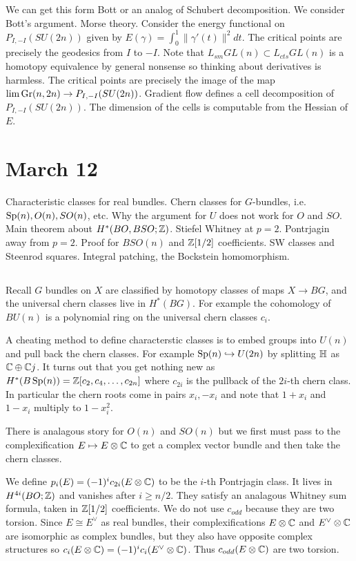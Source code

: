 \documentclass[12pt]{article}
\begin{document}
    We can get this form Bott or an analog of Schubert decomposition. We consider Bott's argument. Morse theory. Consider the energy functional on $P_{I,-I}(SU(2n))$ given by $E(\gamma) = \int_0^1 \|\gamma'(t)\|^2 dt$. The critical points are precisely the geodesics from $I$ to $-I$. Note that $L_{sm} GL(n) \subset L_{cts} GL(n)$ is a homotopy equivalence by general nonsense so thinking about derivatives is harmless. The critical points are precisely the image of the map $\lim \operatorname{Gr}(n, 2n) \to P_{I,-I}(SU(2n))$. Gradient flow defines a cell decomposition of $P_{I,-I}(SU(2n))$. The dimension of the cells is computable from the Hessian of $E$.

    \section{March 12}
    Characteristic classes for real bundles. Chern classes for $G$-bundles, i.e. $\operatorname{Sp}(n), O(n), SO(n)$, etc. Why the argument for $U$ does not work for $O$ and $SO$. Main theorem about $H^*(BO,BSO;\mathbb{Z})$. Stiefel Whitney at $p=2$. Pontrjagin away from $p=2$. Proof for $BSO(n)$ and $\mathbb{Z}[1/2]$ coefficients. SW classes and Steenrod squares. Integral patching, the Bockstein homomorphism.

    \subsection{}
    Recall $G$ bundles on $X$ are classified by homotopy classes of maps $X \to BG$, and the universal chern classes live in $H^*(BG)$. For example the cohomology of $BU(n)$ is a polynomial ring on the universal chern classes $c_i$. 

    A cheating method to define characterstic classes is to embed groups into $U(n)$ and pull back the chern classes. For example $\operatorname{Sp}(n) \hookrightarrow U(2n)$ by splitting $\mathbb{H}$ as $\mathbb{C}\oplus \mathbb{C} j$. It turns out that you get nothing new as $H^*(B\operatorname{Sp}(n)) = \mathbb{Z}[c_2, c_4, \dots, c_{2n}]$ where $c_{2i}$ is the pullback of the $2i$-th chern class. In particular the chern roots come in pairs $x_i, -x_i$ and note that $1+x_i$ and $1-x_i$ multiply to $1-x_i^2$. 
    
    There is analagous story for $O(n)$ and $SO(n)$ but we first must pass to the complexification $E \mapsto E \otimes \mathbb{C}$ to get a complex vector bundle and then take the chern classes. 

    We define $p_i(E) = (-1)^i c_{2i}(E\otimes \mathbb{C})$ to be the $i$-th Pontrjagin class. It lives in $H^{4i}(BO;\mathbb{Z})$ and vanishes after $i \geq n/2$. They satisfy an analagous Whitney sum formula, taken in $\mathbb{Z}[1/2]$ coefficients. We do not use $c_{odd}$ because they are two torsion. Since $E\cong E^\vee$ as real bundles, their complexifications $E\otimes \mathbb{C}$ and $E^\vee \otimes \mathbb{C}$ are isomorphic as complex bundles, but they also have opposite complex structures so $c_i(E\otimes \mathbb{C}) = (-1)^i c_i(E^\vee \otimes \mathbb{C})$. Thus $c_{odd}(E\otimes \mathbb{C})$ are two torsion.
\end{document}
